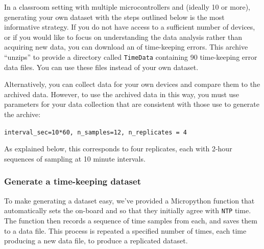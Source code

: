 \begin{kaobox}[frametitle=A download-able dataset of time-keeping errors]
	In a classroom setting with multiple microcontrollers and \rtcs (ideally 10 or more), generating your own dataset with the steps outlined below is the most informative strategy. 
	If you do not have access to a sufficient number of devices, or if you would like to focus on understanding the data analysis rather than acquiring new data, you can download an  of time-keeping errors.
	This archive ``unzips'' to provide a directory called \lstinline{TimeData} containing 90 
	time-keeping error data files.
	You can use these files instead of your own dataset.
	
	\smallskip
	Alternatively, you can collect data for your own devices and compare them to the archived data. 
	However, to use the archived data in this way, you must use parameters for your data collection that are consistent with those use to generate the archive: 
	
	\lstinline{interval_sec=10*60, n_samples=12, n_replicates = 4}
	
	As explained below, this corresponds to four replicates, each with 2-hour sequences of sampling at 10 minute intervals.
\end{kaobox}

\subsubsection{\howto Generate a time-keeping dataset}
To make generating a dataset easy, we’ve provided a Micropython function that automatically sets the on-board and  \rtcs so that they initially agree with \texttt{NTP} time.
The function then records a sequence of time samples from each, and saves them to a data file.
This process is repeated a specified number of times, each time producing a new data file, to produce a replicated dataset. 

